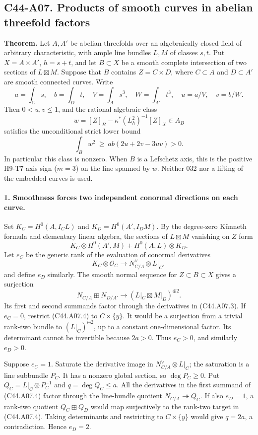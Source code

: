 \documentclass[11pt]{article}
\theoremstyle{remark}\newtheorem{remark}[theorem]{Remark}
\begin{document}
\subsection*{C44-A07. Products of smooth curves in abelian threefold factors}

\textbf{Theorem.}
Let $A,A'$ be abelian threefolds over an algebraically closed field of
arbitrary characteristic, with ample line bundles $L,M$ of classes
$s,t$. Put $X=A\times A'$, $h=s+t$, and let $B\subset X$ be a smooth
complete intersection of two sections of $L\boxtimes M$.
Suppose that $B$ contains $Z=C\times D$, where $C\subset A$ and
$D\subset A'$ are smooth connected curves. Write
\[
 a=\int_Cs,\quad b=\int_Dt,\quad
 V=\int_As^3,\quad W=\int_{A'}t^3,\quad
 u=a/V,\quad v=b/W.
\]
Then $0<u,v\le1$, and the rational algebraic class
\[
 w=[Z]_B-\kappa^*(L_h^2)^{-1}[Z]_X\in A_B
 \tag{C44.A07.1}
\]
satisfies the unconditional strict lower bound
\[
 \int_Bw^2\ \ge\ ab(2u+2v-3uv)>0.
 \tag{C44.A07.2}
\]
In particular this class is nonzero. When $B$ is a Lefschetz axis,
this is the positive H9-T7 axis sign ($m=3$) on the line spanned by
$w$. Neither 032 nor a lifting of the embedded curves is used.

\paragraph{1. Smoothness forces two independent conormal directions on each curve.}
Set $K_C=H^0(A,I_CL)$ and $K_D=H^0(A',I_DM)$. By the degree-zero
K\"unneth formula and elementary linear algebra, the sections of
$L\boxtimes M$ vanishing on $Z$ form
\[
 K_C\otimes H^0(A',M)+H^0(A,L)\otimes K_D.
 \tag{C44.A07.3}
\]
Let $e_C$ be the generic rank of the evaluation of conormal derivatives
\[
 K_C\otimes\mathcal O_C\longrightarrow N_{C/A}^{\vee}\otimes L|_C,
\]
and define $e_D$ similarly. The smooth normal sequence for $Z\subset
B\subset X$ gives a surjection
\[
 N_{C/A}\boxplus N_{D/A'}\longrightarrow
 (L|_C\boxtimes M|_D)^{\oplus2}.
 \tag{C44.A07.4}
\]
Its first and second summands factor through the derivatives in
(C44.A07.3). If $e_C=0$, restrict (C44.A07.4) to $C\times\{y\}$.
It would be a surjection from a trivial rank-two bundle to
$(L|_C)^{\oplus2}$, up to a constant one-dimensional factor. Its
determinant cannot be invertible because $2a>0$. Thus $e_C>0$,
and similarly $e_D>0$.

Suppose $e_C=1$. Saturate the derivative image in
$N_{C/A}^{\vee}\otimes L|_C$; the saturation is a line subbundle
$P_C$. It has a nonzero global section, so $\deg P_C\ge0$.
Put $Q_C=L|_C\otimes P_C^{-1}$ and $q=\deg Q_C\le a$.
All the derivatives in the first summand of (C44.A07.4) factor
through the line-bundle quotient $N_{C/A}\twoheadrightarrow Q_C$.
If also $e_D=1$, a rank-two quotient
$Q_C\boxplus Q_D$ would map surjectively to the rank-two target in
(C44.A07.4). Taking determinants and restricting to $C\times\{y\}$
would give $q=2a$, a contradiction. Hence $e_D=2$.
\end{document}
